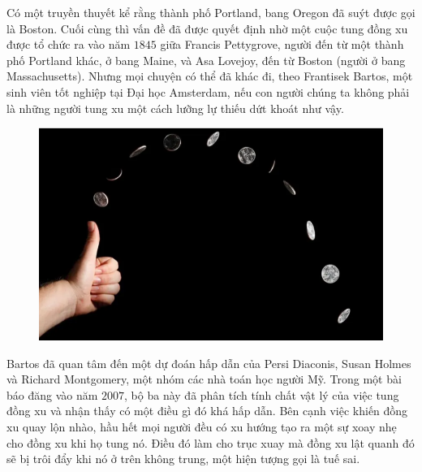 \vspace*{182pt}

%
%

\begin{multicols}{2}
	Có một truyền thuyết  kể rằng thành phố Portland, bang Oregon đã suýt được gọi là Boston. Cuối cùng thì vấn đề đã được quyết định nhờ một cuộc tung đồng xu được tổ chức ra vào năm $1845$ giữa Francis Pettygrove, người đến từ một thành phố Portland khác, ở bang Maine, và Asa Lovejoy, đến từ Boston (người ở bang Massachusetts). Nhưng mọi chuyện có thể đã khác đi, theo Frantisek Bartos, một sinh viên tốt nghiệp tại Đại học Amsterdam, nếu con người chúng ta  không phải là những người tung xu một cách lưỡng lự thiếu dứt khoát như vậy.
	\begin{figure}[H]
		\vspace*{-5pt}
		\centering
		\captionsetup{labelformat= empty, justification=centering}
		\includegraphics[width= 1\linewidth]{1111}
		\vspace*{-15pt}
	\end{figure}
	Bartos đã quan tâm đến một dự đoán hấp dẫn của Persi Diaconis, Susan Holmes và Richard Montgomery, một nhóm các nhà toán học người Mỹ. Trong một bài báo đăng vào năm $2007$, bộ ba này đã phân tích tính chất vật lý của việc tung đồng xu và nhận thấy có một điều gì đó khá hấp dẫn. Bên cạnh việc khiến đồng xu quay lộn nhào, hầu hết mọi người đều có xu hướng tạo ra một sự xoay nhẹ cho đồng xu khi họ tung nó. Điều đó làm cho trục xuay mà đồng xu lật quanh đó sẽ bị trôi đẩy khi nó ở trên không trung, một hiện tượng gọi là tuế sai.

\end{multicols}
